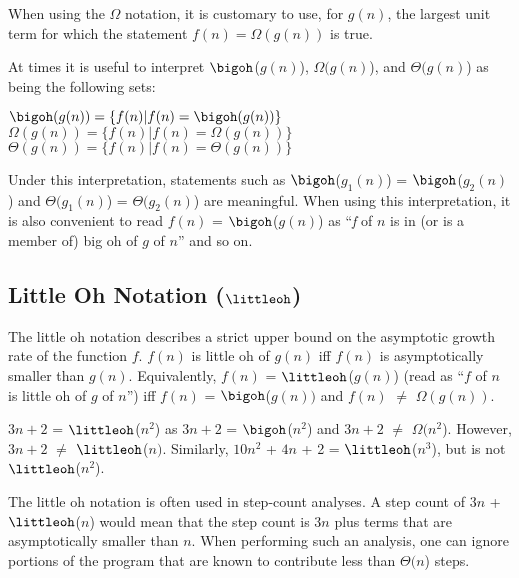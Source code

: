 When using the $\Omega$ notation,
it is customary to use, for $g(n)$, the largest unit term
for which the statement $f(n) = \Omega (g(n))$ is true.

At times it is useful to interpret $\bigoh$($g(n)$), $\Omega ( g(n)$),
and $\Theta ( g(n)$) as being the following sets:

$\bigoh ( g(n) ) = \{ f(n) | f(n)  =  \bigoh ( g(n) )\}$\\

$\Omega ( g(n) ) = \{ f(n)  |  f(n)  =  \Omega ( g(n) )\}$\\

$\Theta ( g(n) ) = \{ f(n)  |  f(n)  =  \Theta ( g(n) )\}$
 
Under this interpretation,
statements such as $\bigoh$($g_1 (n)$) = $\bigoh$($g_2 (n)$) and
$\Theta ( g_1 (n)$) = $\Theta ( g_2 (n)$) are meaningful.
When using this interpretation, it is also
convenient to read $f(n)$ = $\bigoh$($g(n)$) as ``{\it f} of $n$ is
in (or is a member of) big oh of $g$ of $n$'' and so on.

\subsection{%
Little Oh Notation ($\littleoh$)
}
The little oh notation describes a strict upper bound on the
asymptotic growth rate of the function $f$.
$f(n)$ is little oh of $g(n)$ iff $f(n)$ is asymptotically
smaller than $g(n)$.
Equivalently, $f(n)$ = $\littleoh$($g(n)$) (read as ``$f$ of $n$ is
little oh of $g$ of $n$'') iff 
$f(n)$ = $\bigoh$($g(n))$ and $f(n)$ $\neq$ $\Omega ( g(n))$.
 
\begin{example}
\label{E2:ex.small}
$3n + 2$ = $\littleoh$($n^2$) as $3n + 2$ = $\bigoh$($n^2$)
and $3n + 2$ $\neq$ $\Omega ( n^2$).  However, $3n + 2$ $\neq$ $\littleoh$($n)$.
Similarly, $10n^2$ + $4n$ + 2
= $\littleoh$($n^3$), but is not $\littleoh$($n^2$).
\end{example}

 
The little oh notation is often used
in step-count analyses.  A step count of $3n$ + $\littleoh$($n$) would mean that
the step count is $3n$ plus terms that are asymptotically smaller than $n$.
When performing such an analysis, one can ignore portions of the
program that are known to contribute less than $\Theta ( n$) steps.
 

